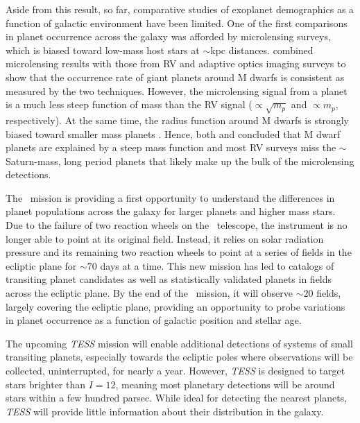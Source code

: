 Aside from this result, so far, comparative studies of exoplanet
demographics as a function of galactic environment have been limited.
One of the first comparisons in planet occurrence across the galaxy
was afforded by microlensing surveys, which is biased toward low-mass
host stars at $\sim$kpc distances. 
\citet{Clanton14b} 
combined microlensing results
\citep[e.g.][]{Gould10,Sumi10,Cassan12} with those from RV and 
adaptive optics imaging surveys
\citep{Montet14} to show that the occurrence rate of giant
planets around M dwarfs is consistent as measured by the two
techniques. However, the microlensing signal from a planet is a much
less steep function of mass than the RV signal ($\propto \sqrt{m_p}$
and $\propto m_p$, respectively). At the
same time, the radius function around M dwarfs is strongly biased toward
smaller mass planets \citep{Swift13, Morton14}. Hence,
both \citet{Clanton14b} and \citet{Montet14} concluded that M dwarf planets
are explained by a steep mass function and most RV surveys miss the
$\sim$Saturn-mass, long period planets that likely make up the bulk of
the microlensing detections.

The \KT\ mission is providing a first opportunity to understand the
differences in planet populations across the galaxy for larger planets
and higher mass stars.  Due to the failure of two reaction wheels on
the \kep\ telescope, the instrument is no longer able to point at its
original field.  Instead, it relies on solar radiation pressure and
its remaining two reaction wheels to point at a series of fields in
the ecliptic plane for $\sim 70$ days at a time.  This new mission has
led to catalogs of transiting planet candidates
\citep{Foreman-Mackey15, Vanderburg16} as well as statistically
validated planets \citep{Montet15b} in fields across the ecliptic
plane.  By the end of the \KT\ mission, it will observe $\sim 20$
fields, largely covering the ecliptic plane, providing an opportunity
to probe variations in planet occurrence as a function of galactic
position and stellar age.

The upcoming \textit{TESS} mission \citep{Ricker14} will enable additional
detections of systems of small transiting planets, especially towards
the ecliptic poles where observations will be collected,
uninterrupted, for nearly a year.  However, \textit{TESS} is designed to
target stars brighter than $I = 12$, meaning most planetary detections
will be around stars within a few hundred parsec.  While ideal for
detecting the nearest planets, \textit{TESS} will provide little information
about their distribution in the galaxy.

